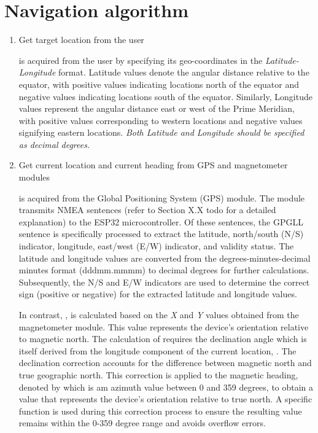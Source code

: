 \section{Navigation algorithm}
\begin{enumerate}
  \item  Get target location \tLoc from the user

        \tLoc is acquired from the user by specifying its geo-coordinates in the \emph{Latitude-Longitude} format. Latitude values denote the angular distance relative
        to the equator, with positive values indicating locations north of the equator and negative values indicating locations south of the equator. Similarly, Longitude values
        represent the angular distance east or west of the Prime Meridian, with positive values corresponding to western locations and negative values signifying eastern locations.
        \emph{Both Latitude and Longitude should be specified as decimal degrees.}

  \item  Get current location \cLoc and current heading \cHeading from GPS and magnetometer modules

        \cLoc is acquired from the Global Positioning System (GPS) module. The module transmits NMEA sentences (refer to Section X.X todo for a detailed
        explanation) to the ESP32 microcontroller.  Of these sentences, the GPGLL sentence is specifically processed to extract the latitude, north/south (N/S) indicator, longitude,
        east/west (E/W) indicator, and validity status.  The latitude and longitude values are converted from the degrees-minutes-decimal minutes format (dddmm.mmmm)
        to decimal degrees for further calculations.  Subsequently, the N/S and E/W indicators are used to determine the correct sign (positive or negative) for the extracted
        latitude and longitude values.

        In contrast, \cHeading, is calculated based on the \emph X and \emph Y values obtained from the magnetometer module.
        This value represents the device's orientation relative to magnetic north. The calculation of \cHeading requires the declination angle \decAngle which is itself derived from the
        longitude component of the current location, \cLoc. The declination correction accounts for the difference between magnetic north and true geographic north.  This correction is 
        applied to the magnetic heading, denoted by \cHeading which is am azimuth value between 0 and 359 degrees, to obtain a value that represents the device's orientation relative to 
        true north. A specific function is used during this correction process to ensure the resulting value remains within the 0-359 degree range and avoids overflow errors.


\end{enumerate}
